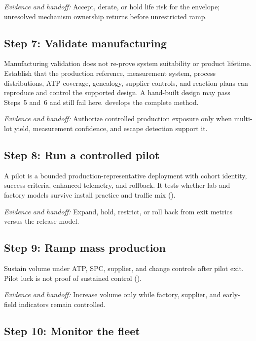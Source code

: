 \textit{Evidence and handoff:} Accept, derate, or hold life risk for the
envelope; unresolved mechanism ownership returns before unrestricted ramp.

\subsection{Step 7: Validate manufacturing}
\label{sec:ladder-production}

Manufacturing validation does not re-prove system suitability or product
lifetime. Establish that the production reference, measurement system, process
distributions, ATP coverage, genealogy, supplier controls, and reaction plans
can reproduce and control the supported design. A hand-built design may pass
Steps~5 and~6 and still fail here.  develops the
complete method.

\textit{Evidence and handoff:} Authorize controlled production exposure only
when multi-lot yield, measurement confidence, and escape detection support it.

\subsection{Step 8: Run a controlled pilot}
\label{sec:ladder-fleet}

A pilot is a bounded production-representative deployment with cohort identity,
success criteria, enhanced telemetry, and rollback. It tests whether lab and
factory models survive install practice and traffic mix
().

\textit{Evidence and handoff:} Expand, hold, restrict, or roll back from exit
metrics versus the release model.

\subsection{Step 9: Ramp mass production}
\label{sec:ladder-mp}

Sustain volume under ATP, SPC, supplier, and change controls after pilot exit.
Pilot luck is not proof of sustained control ().

\textit{Evidence and handoff:} Increase volume only while factory, supplier, and
early-field indicators remain controlled.

\subsection{Step 10: Monitor the fleet}
\label{sec:ladder-fleet-monitor}

